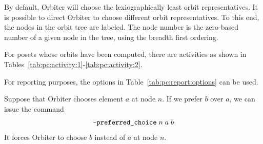 
By default, Orbiter will choose the lexiographically least orbit representatives. 
It is possible to direct Orbiter to choose different orbit representatives. 
To this end, the nodes in the orbit tree are labeled. 
The node number is the zero-based number of a given node in the tree, 
using the breadth first ordering. 

\bigskip

For posets whose orbits have been computed, 
there are activities as shown in Tables~\ref{tab:pc:activity:1}-\ref{tab:pc:activity:2}. 

\bigskip

For reporting purposes, the options in Table~\ref{tab:pc:report:options} can be used. 

\bigskip

Suppose that Orbiter chooses element $a$ at node $n.$ 
If we prefer $b$ over $a$, we can issue the command 
$$
\verb'-preferred_choice' \; n \; a \; b
$$
It forces Orbiter to choose $b$ instead of $a$ at node $n$.

